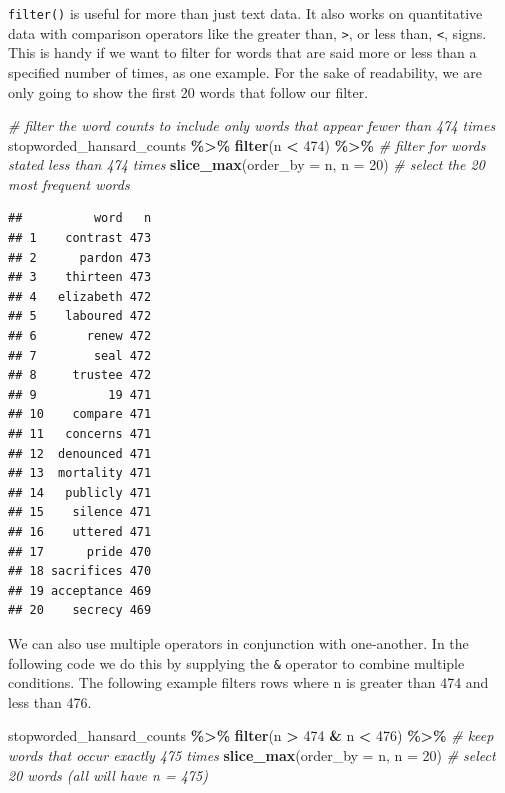 \documentclass[
]{article}
\newenvironment{Shaded}{\begin{snugshade}}{\end{snugshade}}
\newcommand{\AttributeTok}[1]{\textcolor[rgb]{0.13,0.29,0.53}{#1}}
\newcommand{\CommentTok}[1]{\textcolor[rgb]{0.56,0.35,0.01}{\textit{#1}}}
\newcommand{\DecValTok}[1]{\textcolor[rgb]{0.00,0.00,0.81}{#1}}
\newcommand{\FunctionTok}[1]{\textcolor[rgb]{0.13,0.29,0.53}{\textbf{#1}}}
\newcommand{\NormalTok}[1]{#1}
\newcommand{\SpecialCharTok}[1]{\textcolor[rgb]{0.81,0.36,0.00}{\textbf{#1}}}
\begin{document}
\texttt{filter()} is useful for more than just text data. It also works
on quantitative data with comparison operators like the greater than,
\texttt{\textgreater{}}, or less than, \texttt{\textless{}}, signs. This
is handy if we want to filter for words that are said more or less than
a specified number of times, as one example. For the sake of
readability, we are only going to show the first 20 words that follow
our filter.

\begin{Shaded}
\begin{Highlighting}[]
\CommentTok{\# filter the word counts to include only words that appear fewer than 474 times}
\NormalTok{stopworded\_hansard\_counts }\SpecialCharTok{\%\textgreater{}\%} 
  \FunctionTok{filter}\NormalTok{(n }\SpecialCharTok{\textless{}} \DecValTok{474}\NormalTok{) }\SpecialCharTok{\%\textgreater{}\%} \CommentTok{\# filter for words stated less than 474 times}
  \FunctionTok{slice\_max}\NormalTok{(}\AttributeTok{order\_by =}\NormalTok{ n, }\AttributeTok{n =} \DecValTok{20}\NormalTok{) }\CommentTok{\# select the 20 most frequent words}
\end{Highlighting}
\end{Shaded}

\begin{verbatim}
##          word   n
## 1    contrast 473
## 2      pardon 473
## 3    thirteen 473
## 4   elizabeth 472
## 5    laboured 472
## 6       renew 472
## 7        seal 472
## 8     trustee 472
## 9          19 471
## 10    compare 471
## 11   concerns 471
## 12  denounced 471
## 13  mortality 471
## 14   publicly 471
## 15    silence 471
## 16    uttered 471
## 17      pride 470
## 18 sacrifices 470
## 19 acceptance 469
## 20    secrecy 469
\end{verbatim}

We can also use multiple operators in conjunction with one-another. In
the following code we do this by supplying the \texttt{\&} operator to
combine multiple conditions. The following example filters rows where n
is greater than 474 and less than 476.

\begin{Shaded}
\begin{Highlighting}[]
\NormalTok{stopworded\_hansard\_counts }\SpecialCharTok{\%\textgreater{}\%} 
  \FunctionTok{filter}\NormalTok{(n }\SpecialCharTok{\textgreater{}} \DecValTok{474} \SpecialCharTok{\&}\NormalTok{ n }\SpecialCharTok{\textless{}} \DecValTok{476}\NormalTok{) }\SpecialCharTok{\%\textgreater{}\%} \CommentTok{\# keep words that occur exactly 475 times}
  \FunctionTok{slice\_max}\NormalTok{(}\AttributeTok{order\_by =}\NormalTok{ n, }\AttributeTok{n =} \DecValTok{20}\NormalTok{) }\CommentTok{\# select 20 words (all will have n = 475)}
\end{Highlighting}
\end{Shaded}
\end{document}

